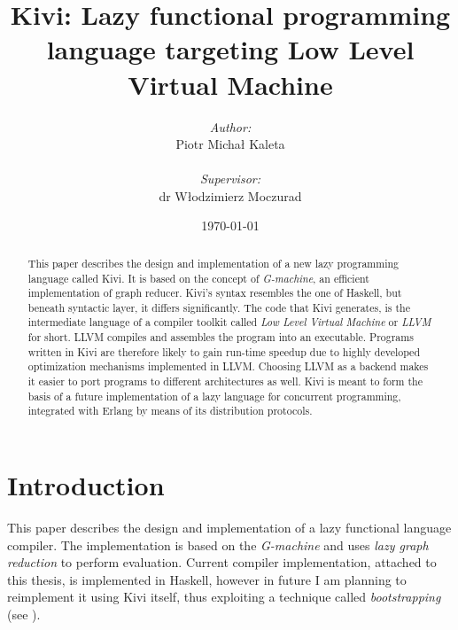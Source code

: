 \documentclass[12pt,a4paper]{report}
\begin{document}
\title{Kivi: Lazy functional programming language targeting Low Level Virtual Machine}
\author{\textit{Author:}\\Piotr Micha\l{} Kaleta\\\\\emph{Supervisor:}\\dr W\l{}odzimierz Moczurad}
\date{\today}

\maketitle

\newpage
\thispagestyle{empty}
\mbox{}

\onehalfspace

\Huge
\begin{abstract}
  \normalsize
  \center
  This paper describes the design and implementation of a new lazy programming
  language called Kivi. It is based on the concept of \textit{G-machine}, an
  efficient implementation of graph reducer. Kivi's syntax resembles the one of
  Haskell, but beneath syntactic layer, it differs significantly. The code that
  Kivi generates, is the intermediate language of a compiler toolkit called
  \textit{Low Level Virtual Machine}\cite{website:llvm} or \textit{LLVM} for
  short. LLVM compiles and assembles the program into an executable. Programs
  written in Kivi are therefore likely to gain run-time speedup due to highly
  developed optimization mechanisms implemented in LLVM. Choosing LLVM as a
  backend makes it easier to port programs to different architectures as well.
  Kivi is meant to form the basis of a future implementation of a lazy language
  for concurrent programming, integrated with Erlang by means of its
  distribution protocols.
\end{abstract}

\normalsize

\tableofcontents
\newpage

\chapter{Introduction}

This paper describes the design and implementation of a lazy functional
language compiler. The implementation is based on the
\textit{G-machine}\cite{Jon87} and uses \textit{lazy graph reduction} to
perform evaluation. Current compiler implementation, attached to this thesis,
is implemented in Haskell, however in future I am planning to reimplement it
using Kivi itself, thus exploiting a technique called \textit{bootstrapping}
(see \cite{wiki:bootstrapping}).
\end{document}
